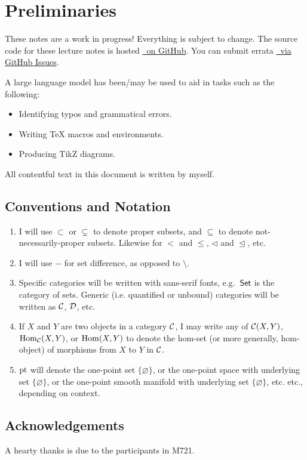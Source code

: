 \chapter*{Preliminaries}

\begin{warning}
    These notes are a work in progress! Everything is subject to change. The source code for these lecture notes is hosted \href{https://github.com/diracdeltafunk/M721-Notes-F26}{\faGithub~on GitHub}. You can submit errata \href{https://github.com/diracdeltafunk/M721-Notes-F26/issues}{\faGithub~via GitHub Issues}.
\end{warning}

\begin{disclaimer}{}
    A large language model has been/may be used to aid in tasks such as the following:
    \begin{itemize}
        \item Identifying typos and grammatical errors.
        \item Writing TeX macros and environments.
        \item Producing TikZ diagrams.
    \end{itemize}
    All contentful text in this document is written by myself.
\end{disclaimer}

\section*{Conventions and Notation}

\begin{enumerate}[label=(CN\arabic*)]
    \item I will use $\subset$ or $\subsetneq$ to denote proper subsets, and $\subseteq$ to denote not-necessarily-proper subsets. Likewise for $<$ and $\leq$, $\triangleleft$ and $\trianglelefteq$, etc.
    \item I will use $-$ for set difference, as opposed to $\setminus$.
    \item Specific categories will be written with sans-serif fonts, e.g.\ $\mathsf{Set}$ is the category of sets. Generic (i.e. quantified or unbound) categories will be written as $\mathcal{C}$, $\mathcal{D}$, etc.
    \item If $X$ and $Y$ are two objects in a category $\mathcal{C}$, I may write any of $\mathcal{C}(X,Y)$, $\operatorname{Hom}_{\mathcal{C}}(X,Y)$, or $\operatorname{Hom}(X,Y)$ to denote the hom-set (or more generally, hom-object) of morphisms from $X$ to $Y$ in $\mathcal{C}$.
    \item $\mathrm{pt}$ will denote the one-point set $\{\varnothing\}$, or the one-point space with underlying set $\{\varnothing\}$, or the one-point smooth manifold with underlying set $\{\varnothing\}$, etc. etc., depending on context.
\end{enumerate}

\section*{Acknowledgements}

A hearty thanks is due to the participants in M721.